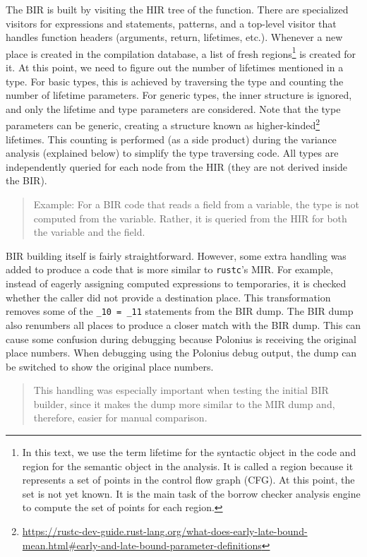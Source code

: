 \documentclass[
  11pt,
  twoside,symmetric]{report}
\DeclareRobustCommand{\href}[2]{#2\footnote{\url{#1}}}
\begin{document}
The BIR is built by visiting the HIR tree of the function. There are
specialized visitors for expressions and statements, patterns, and a
top-level visitor that handles function headers (arguments, return,
lifetimes, etc.). Whenever a new place is created in the compilation
database, a list of fresh regions\footnote{In this text, we use the term
  lifetime for the syntactic object in the code and region for the
  semantic object in the analysis. It is called a region because it
  represents a set of points in the control flow graph (CFG). At this
  point, the set is not yet known. It is the main task of the borrow
  checker analysis engine to compute the set of points for each region.}
is created for it. At this point, we need to figure out the number of
lifetimes mentioned in a type. For basic types, this is achieved by
traversing the type and counting the number of lifetime parameters. For
generic types, the inner structure is ignored, and only the lifetime and
type parameters are considered. Note that the type parameters can be
generic, creating a structure known as
\href{https://rustc-dev-guide.rust-lang.org/what-does-early-late-bound-mean.html\#early-and-late-bound-parameter-definitions}{higher-kinded}
lifetimes. This counting is performed (as a side product) during the
variance analysis (explained below) to simplify the type traversing
code. All types are independently queried for each node from the HIR
(they are not derived inside the BIR).

\begin{quote}
Example: For a BIR code that reads a field from a variable, the type is
not computed from the variable. Rather, it is queried from the HIR for
both the variable and the field.
\end{quote}

BIR building itself is fairly straightforward. However, some extra
handling was added to produce a code that is more similar to
\texttt{rustc}'s MIR. For example, instead of eagerly assigning computed
expressions to temporaries, it is checked whether the caller did not
provide a destination place. This transformation removes some of the
\texttt{\_10\ =\ \_11} statements from the BIR dump. The BIR dump also
renumbers all places to produce a closer match with the BIR dump. This
can cause some confusion during debugging because Polonius is receiving
the original place numbers. When debugging using the Polonius debug
output, the dump can be switched to show the original place numbers.

\begin{quote}
This handling was especially important when testing the initial BIR
builder, since it makes the dump more similar to the MIR dump and,
therefore, easier for manual comparison.
\end{quote}
\end{document}
